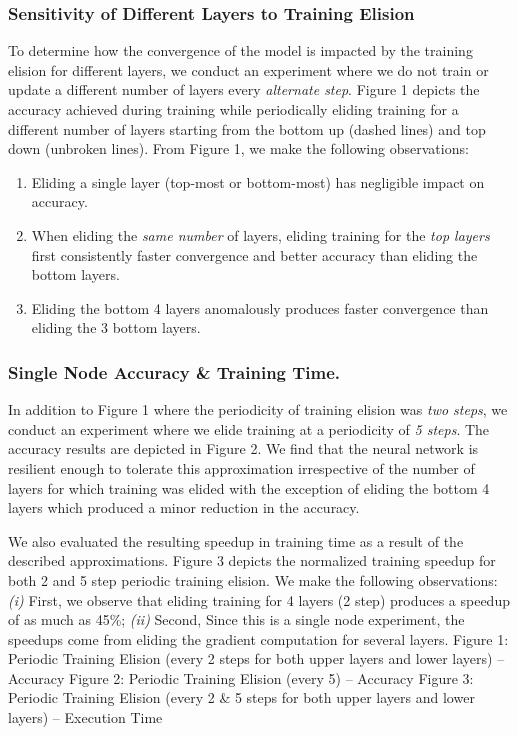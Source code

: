 \subsubsection{Sensitivity of Different Layers to Training Elision}
To determine how the convergence of the model is impacted by the training elision for different layers, we conduct an experiment where we do not train or update a different number of layers every \emph{alternate step}. Figure 1 depicts the accuracy achieved during training while periodically eliding training for a different number of layers starting from the bottom up (dashed lines) and top down (unbroken lines). 
From Figure 1, we make the following observations: 
\begin{enumerate}
\item Eliding a single layer (top-most or bottom-most) has negligible impact on accuracy.
\item When eliding the \emph{same number} of layers, eliding training for the \emph{top layers} first consistently faster convergence and better accuracy than eliding the bottom layers.
\item Eliding the bottom 4 layers anomalously produces faster convergence than eliding the 3 bottom layers. 
\end{enumerate}
\subsubsection{Single Node Accuracy \& Training Time.}
In addition to Figure 1 where the periodicity of training elision was \emph{two steps}, we conduct an experiment where we elide training at a periodicity of \emph{5 steps}. The accuracy results are depicted in Figure 2. We find that the neural network is resilient enough to tolerate this approximation irrespective of the number of layers for which training was elided with the exception of eliding the bottom 4 layers which produced a minor reduction in the accuracy. 

We also evaluated the resulting speedup in training time as a result of the described approximations. Figure 3 depicts the normalized training speedup for both 2 and 5 step periodic training elision. We make the following observations: \emph{(i)} First, we observe that eliding training for 4 layers (2 step) produces a speedup of as much as 45\%; \emph{(ii)} Second, 
Since this is a single node experiment, the speedups come from eliding the gradient computation for several layers.  
Figure 1: Periodic Training Elision (every 2 steps for both upper layers and lower layers) -- Accuracy
Figure 2: Periodic Training Elision (every 5) -- Accuracy
Figure 3: Periodic Training Elision (every 2 \& 5 steps for both upper layers and lower layers) -- Execution Time
